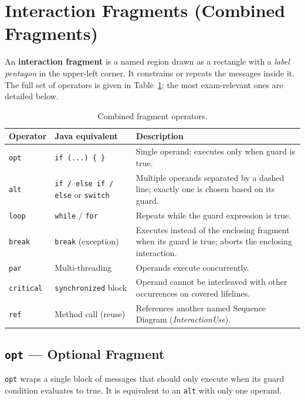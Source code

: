 \documentclass[11pt, a4paper, notitlepage]{report}
\theoremstyle{definition}
\theoremstyle{remark}
\theoremstyle{definition}
\begin{document}
\section{Interaction Fragments (Combined Fragments)}
\label{sec:ch7-fragments}

An \textbf{interaction fragment} is a named region drawn as a rectangle with
a \emph{label pentagon} in the upper-left corner. It constrains or repeats the
messages inside it. The full set of operators is given in
Table~\ref{tab:ch7-fragments}; the most exam-relevant ones are detailed below.

\begin{table}[h]
\centering
\begin{tabular}{@{}p{1.8cm}p{3.5cm}p{7cm}@{}}
\toprule
\textbf{Operator} & \textbf{Java equivalent} & \textbf{Description} \\
\midrule
\texttt{opt}      & \texttt{if (...) \{ \}} & Single operand; executes only when guard is true. \\
\texttt{alt}      & \texttt{if / else if / else} or \texttt{switch} & Multiple operands separated by a dashed line; exactly one is chosen based on its guard. \\
\texttt{loop}     & \texttt{while} / \texttt{for} & Repeats while the guard expression is true. \\
\texttt{break}    & \texttt{break} (exception) & Executes instead of the enclosing fragment when its guard is true; aborts the enclosing interaction. \\
\texttt{par}      & Multi-threading & Operands execute concurrently. \\
\texttt{critical} & \texttt{synchronized} block & Operand cannot be interleaved with other occurrences on covered lifelines. \\
\texttt{ref}      & Method call (reuse) & References another named Sequence Diagram (\emph{InteractionUse}). \\
\bottomrule
\end{tabular}
\caption{Combined fragment operators.}
\label{tab:ch7-fragments}
\end{table}

\subsection{\texttt{opt} --- Optional Fragment}
\label{subsec:ch7-opt}

\texttt{opt} wraps a single block of messages that should only execute when its
guard condition evaluates to true. It is equivalent to an \texttt{alt} with
only one operand.
\end{document}
